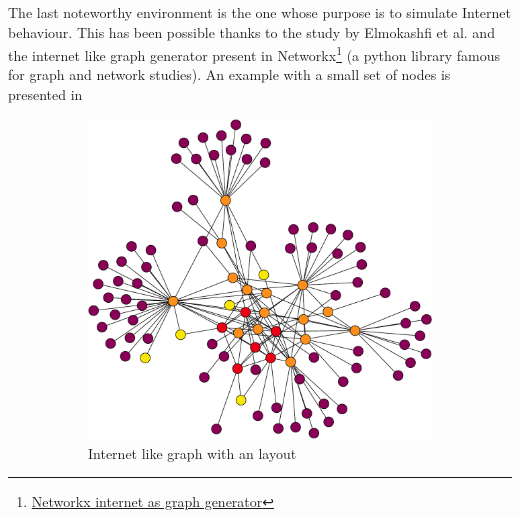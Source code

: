 The last noteworthy environment is the one whose purpose is to simulate Internet
behaviour.
This has been possible thanks to the study by Elmokashfi et al. \cite{elmokashfi2010scalability}
and the internet like graph generator present in Networkx\footnote{\href{https://networkx.org/documentation/stable/reference/generated/networkx.generators.internet_as_graphs.random_internet_as_graph.html#networkx.generators.internet_as_graphs.random_internet_as_graph}{Networkx internet as graph generator}}
(a python library famous for graph and network studies).
An example with a small set of nodes is presented in 

\begin{figure}[h]
     \centering
     \begin{subfigure}[b]{0.45\textwidth}
         \centering
         \includegraphics[width=\textwidth]{images/internet_graph/graph-100-colored.pdf}
		 \caption{Internet like graph with an  layout}
         \label{fig:internet_graph_explosive}
     \end{subfigure}
     \hfill
     \begin{subfigure}[b]{0.45\textwidth}
         \centering

\end{subfigure}
\end{figure}

